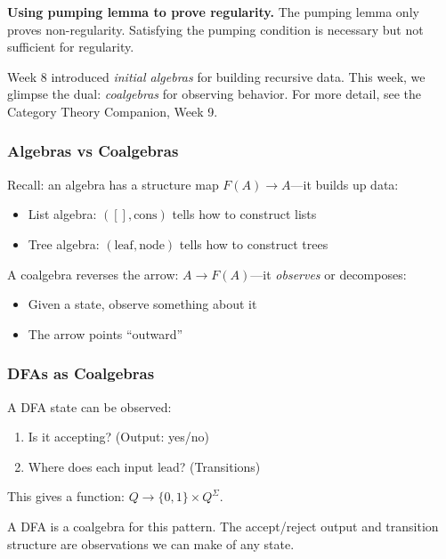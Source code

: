 \begin{commonmistake}
\textbf{Using pumping lemma to prove regularity.} The pumping lemma only proves non-regularity. Satisfying the pumping condition is necessary but not sufficient for regularity.
\end{commonmistake}

\begin{goingdeeper}
Week 8 introduced \emph{initial algebras} for building recursive data. This week, we glimpse the dual: \emph{coalgebras} for observing behavior.
For more detail, see the Category Theory Companion, Week 9.

\subsubsection*{Algebras vs Coalgebras}

Recall: an algebra has a structure map $F(A) \to A$---it builds up data:
\begin{itemize}
  \item List algebra: $([], \text{cons})$ tells how to construct lists
  \item Tree algebra: $(\text{leaf}, \text{node})$ tells how to construct trees
\end{itemize}

A coalgebra reverses the arrow: $A \to F(A)$---it \emph{observes} or decomposes:
\begin{itemize}
  \item Given a state, observe something about it
  \item The arrow points ``outward''
\end{itemize}

\subsubsection*{DFAs as Coalgebras}

A DFA state can be observed:
\begin{enumerate}
  \item Is it accepting? (Output: yes/no)
  \item Where does each input lead? (Transitions)
\end{enumerate}

This gives a function: $Q \to \{0, 1\} \times Q^\Sigma$.

A DFA is a coalgebra for this pattern. The accept/reject output and transition structure are observations we can make of any state.


\end{goingdeeper}
